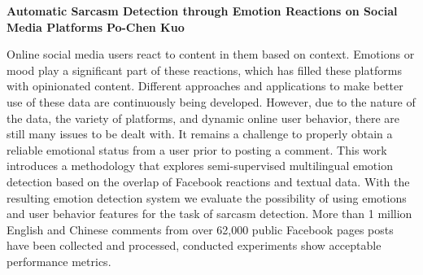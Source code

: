 \setcounter{page}{3}
        \begin{center}            \textbf{\Large{Automatic Sarcasm Detection through Emotion Reactions on Social Media Platforms}}
            \vskip 0.5cm
            \textbf{\Large{Po-Chen Kuo}}
        \end{center}
        Online social media users react to content in them based on context. Emotions or mood play a significant part of these reactions, which has filled these platforms with opinionated content. 
        Different approaches and applications to make better use of these data are continuously being developed.
        However, due to the nature of the data, the variety of platforms, and dynamic online user behavior, there are still many issues to be dealt with. It remains a challenge to properly obtain a reliable emotional status from a user prior to posting a comment. 
        This work introduces a methodology that explores semi-supervised multilingual emotion detection based on the overlap of Facebook reactions and textual data. With the resulting emotion detection system we evaluate the possibility of using emotions and user behavior features for the task of sarcasm detection.
        More than 1 million English and Chinese comments from over 62,000 public Facebook pages posts have been collected and processed, conducted experiments show acceptable performance metrics.


\clearpage
